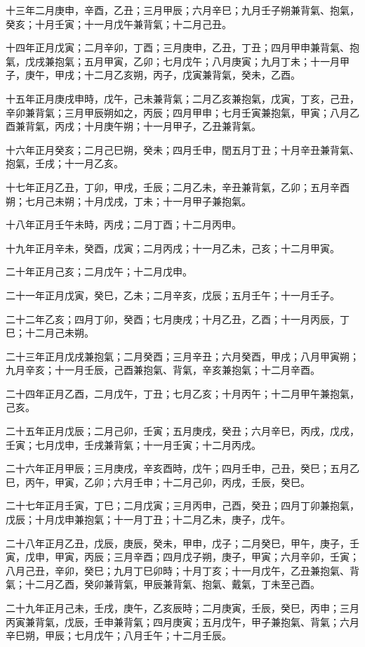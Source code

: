 \begin{pinyinscope}
十三年二月庚申，辛酉，乙丑；三月甲辰；六月辛巳；九月壬子朔兼背氣、抱氣，癸亥；十月壬寅；十一月戊午兼背氣；十二月己丑。

十四年正月戊寅；二月辛卯，丁酉；三月庚申，乙丑，丁丑；四月甲申兼背氣、抱氣，戊戌兼抱氣；五月甲寅，乙卯；七月戊午；八月庚寅；九月丁未；十一月甲子，庚午，甲戌；十二月乙亥朔，丙子，戊寅兼背氣，癸未，乙酉。

十五年正月庚戌申時，戊午，己未兼背氣；二月乙亥兼抱氣，戊寅，丁亥，己丑，辛卯兼背氣；三月甲辰朔如之，丙辰；四月甲申；七月壬寅兼抱氣，甲寅；八月乙酉兼背氣，丙戌；十月庚午朔；十一月甲子，乙丑兼背氣。

十六年正月癸亥；二月己巳朔，癸未；四月壬申，閏五月丁丑；十月辛丑兼背氣、抱氣，壬戌；十一月乙亥。

十七年正月乙丑，丁卯，甲戌，壬辰；二月乙未，辛丑兼背氣，乙卯；五月辛酉朔；七月己未朔；十月戊戌，丁未；十一月甲子兼抱氣。

十八年正月壬午未時，丙戌；二月丁酉；十二月丙申。

十九年正月辛未，癸酉，戊寅；二月丙戌；十一月乙未，己亥；十二月甲寅。

二十年正月己亥；二月戊午；十二月戊申。

二十一年正月戊寅，癸巳，乙未；二月辛亥，戊辰；五月壬午；十一月壬子。

二十二年乙亥；四月丁卯，癸酉；七月庚戌；十月乙丑，乙酉；十一月丙辰，丁巳；十二月己未朔。

二十三年正月戊戌兼抱氣；二月癸酉；三月辛丑；六月癸酉，甲戌；八月甲寅朔；九月辛亥；十一月壬辰，己酉兼抱氣、背氣，辛亥兼抱氣；十二月辛酉。

二十四年正月乙酉，二月戊午，丁丑；七月乙亥；十月丙午；十二月甲午兼抱氣，己亥。

二十五年正月戊辰；二月己卯，壬寅；五月庚戌，癸丑；六月辛巳，丙戌，戊戌，壬寅；七月戊申，壬戌兼背氣；十一月壬寅；十二月丙戌。

二十六年正月甲辰；三月庚戌，辛亥酉時，戊午；四月壬申，己丑，癸巳；五月乙巳，丙午，甲寅，乙卯；六月壬申；十二月己卯，丙戌，壬辰，癸巳。

二十七年正月壬寅，丁巳；二月戊寅；三月丙申，己酉，癸丑；四月丁卯兼抱氣，戊辰；十月戊申兼抱氣；十一月丁丑；十二月乙未，庚子，戊午。

二十八年正月乙丑，戊辰，庚辰，癸未，甲申，戊子；二月癸巳，甲午，庚子，壬寅，戊申，甲寅，丙辰；三月辛酉；四月戊子朔，庚子，甲寅；六月辛卯，壬寅；八月己丑，辛卯，癸巳；九月丁巳卯時；十月丁亥；十一月戊午，乙丑兼抱氣、背氣；十二月乙酉，癸卯兼背氣，甲辰兼背氣、抱氣、戴氣，丁未至己酉。

二十九年正月己未，壬戌，庚午，乙亥辰時；二月庚寅，壬辰，癸巳，丙申；三月丙寅兼背氣，戊辰，壬申兼背氣；四月庚寅；五月戊午，甲子兼抱氣、背氣；六月辛巳朔，甲辰；七月戊午；八月壬午；十二月壬辰。


\end{pinyinscope}
